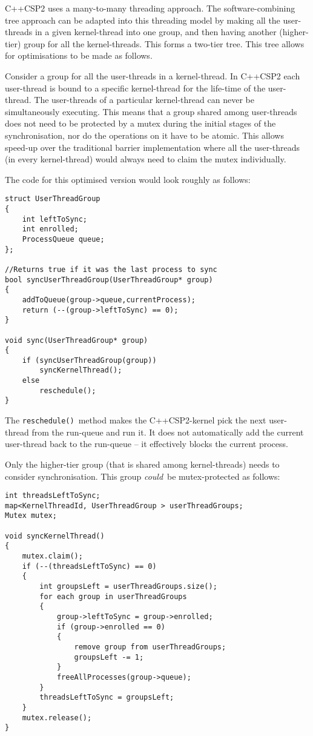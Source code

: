\documentclass[12pt]{IOS-Book-Article-CPA-2007}
\newcommand{\code}[1]{{\small\texttt{#1}}}
\begin{document}
C++CSP2 uses a many-to-many threading approach.  The software-combining tree approach can be adapted into this threading model by making all the user-threads 
in a given kernel-thread into one group, and then having another (higher-tier) group for all the kernel-threads.  This forms a two-tier tree.  This
tree allows for optimisations to be made as follows.

Consider a group for all the user-threads in a kernel-thread.  In C++CSP2 each user-thread is bound to a specific kernel-thread for the life-time of the user-thread.  
The user-threads of a particular kernel-thread can never be simultaneously executing.  
This means that a group shared among user-threads does not need to be protected by a mutex during
the initial stages of the synchronisation, nor do the operations on it have to be atomic.  This allows speed-up over the traditional barrier implementation
where all the user-threads (in every kernel-thread) would always need to claim the mutex individually. 

The code for this optimised version would look roughly as follows:

{\small\begin{verbatim}
struct UserThreadGroup
{
    int leftToSync;
    int enrolled;
    ProcessQueue queue;
};

//Returns true if it was the last process to sync
bool syncUserThreadGroup(UserThreadGroup* group)
{
    addToQueue(group->queue,currentProcess);
    return (--(group->leftToSync) == 0);
}

void sync(UserThreadGroup* group)
{
    if (syncUserThreadGroup(group))
        syncKernelThread();
    else
        reschedule();
}
\end{verbatim}}

The \code{reschedule()}~method makes the C++CSP2-kernel pick the next user-thread from the run-queue and run it.  It does not automatically add the 
current user-thread back to the run-queue -- it effectively blocks the current process.

Only the higher-tier group (that is shared among kernel-threads) needs to consider synchronisation.  This group \textit{could}~be mutex-protected as follows:

{\small\begin{verbatim}
int threadsLeftToSync;
map<KernelThreadId, UserThreadGroup > userThreadGroups;
Mutex mutex;

void syncKernelThread()
{
    mutex.claim();
    if (--(threadsLeftToSync) == 0)
    {
        int groupsLeft = userThreadGroups.size();
        for each group in userThreadGroups
        {
            group->leftToSync = group->enrolled;
            if (group->enrolled == 0)
            {
                remove group from userThreadGroups;
                groupsLeft -= 1;
            }
            freeAllProcesses(group->queue);
        }
        threadsLeftToSync = groupsLeft;
    }
    mutex.release();
}
\end{verbatim}}
\end{document}
